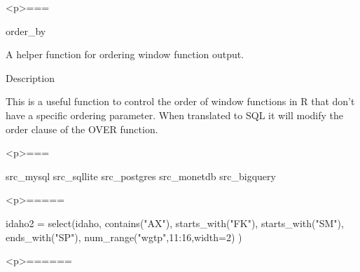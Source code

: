 <p>===

order_by 

A helper function for ordering window function output.

Description

This is a useful function to control the order of window functions in R that don’t have a specific
ordering parameter. When translated to SQL it will modify the order clause of the OVER function.

<p>===

src_mysql
src_sqllite
src_postgres
src_monetdb
src_bigquery

<p>===== %

idaho2 = select(idaho,
contains("AX"),
starts_with("FK"),
starts_with("SM"),
ends_with("SP"),
num_range("wgtp",11:16,width=2)
)

<p>====== %
